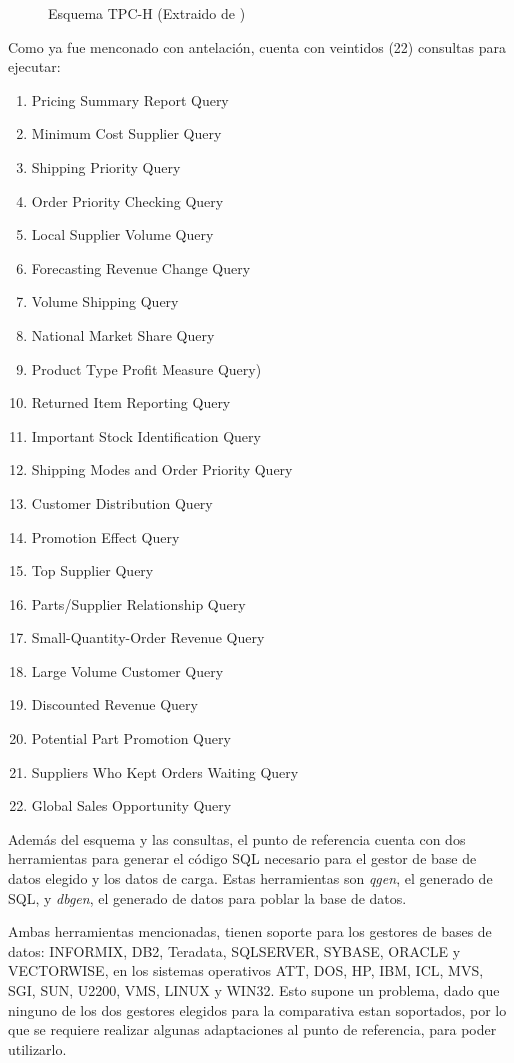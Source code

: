 \documentclass[11pt, twocolumns]{article}
\begin{document}
\begin{multicols}{2}
\begin{figure}[H]
  \centering
  \caption{Esquema TPC-H (Extraido de \cite{tpc2018benchmark})}
  \label{figura:tpch_esquema}
\end{figure}
\par
Como ya fue menconado con antelación, cuenta con veintidos (22) consultas para ejecutar:
\begin{enumerate}
  \item Pricing Summary Report Query
  \item Minimum Cost Supplier Query
  \item Shipping Priority Query
  \item Order Priority Checking Query
  \item Local Supplier Volume Query
  \item Forecasting Revenue Change Query
  \item Volume Shipping Query
  \item National Market Share Query
  \item Product Type Profit Measure Query)
  \item Returned Item Reporting Query
  \item Important Stock Identification Query
  \item Shipping Modes and Order Priority Query
  \item Customer Distribution Query
  \item Promotion Effect Query
  \item Top Supplier Query
  \item Parts/Supplier Relationship Query
  \item Small-Quantity-Order Revenue Query
  \item Large Volume Customer Query
  \item Discounted Revenue Query
  \item Potential Part Promotion Query
  \item Suppliers Who Kept Orders Waiting Query
  \item Global Sales Opportunity Query
\end{enumerate}
\par
Además del esquema y las consultas, el punto de referencia cuenta con dos herramientas para generar el código SQL necesario para el gestor de base de datos elegido y los datos de carga. Estas herramientas son \textit{qgen}, el generado de SQL, y \textit{dbgen}, el generado de datos para poblar la base de datos.
\par
Ambas herramientas mencionadas, tienen soporte para los gestores de bases de datos: INFORMIX, DB2, Teradata, SQLSERVER, SYBASE, ORACLE y VECTORWISE, en los sistemas operativos ATT, DOS, HP, IBM, ICL, MVS, SGI, SUN, U2200, VMS, LINUX y WIN32. Esto supone un problema, dado que ninguno de los dos gestores elegidos para la comparativa estan soportados, por lo que se requiere realizar algunas adaptaciones al punto de referencia, para poder utilizarlo.



\end{multicols}
\end{document}
